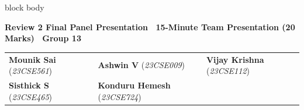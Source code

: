 \documentclass[aspectratio=169, 10pt]{beamer}
\newenvironment{card}[1][]{%
        \begin{beamercolorbox}[rounded=true,shadow=false,wd=\linewidth,sep=3.5pt,#1]{block body}%
        \fontsize{7.8pt}{9.8pt}\selectfont%
    }{%
        \end{beamercolorbox}%
    }
\begin{document}
\begin{frame}[plain]
\begin{center}
            \begin{card}                                                                                                                                                                               
                \centering                                                                                                                                                                             
                {\fontsize{8pt}{10pt}\selectfont \textbf{\color{NavyPrimary}Review 2 Final Panel Presentation \textbullet\ 15-Minute Team Presentation (20 Marks) \textbullet\ Group 13}}\\[0.12cm]    
                \footnotesize                                                                                                                                                                          
                \begin{tabular}{p{4.3cm}p{4.3cm}p{4.3cm}}                                                                                                                                              
                    \textbf{Mounik Sai} (\textit{23CSE561}) & \textbf{Ashwin V} (\textit{23CSE009}) & \textbf{Vijay Krishna} (\textit{23CSE112}) \\                                                       
                    \textbf{Sisthick S} (\textit{23CSE465}) & \textbf{Konduru Hemesh} (\textit{23CSE724})                                        
                \end{tabular}                                                                                                                                                                          
            \end{card}                                                                                                                                                                                 
        \end{center}                                                                                                                                                                                   
    \end{frame}                                                                                                                                                                                        
                                                                                                                                                                                                       
\end{document}
